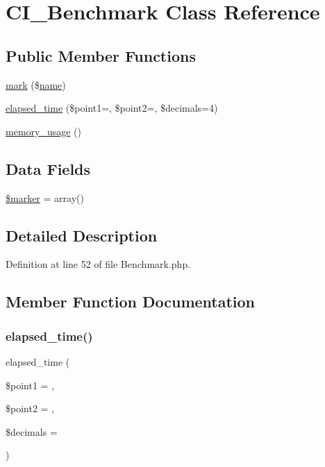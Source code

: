 \hypertarget{class_c_i___benchmark}{}\section{C\+I\+\_\+\+Benchmark Class Reference}
\label{class_c_i___benchmark}
\subsection*{Public Member Functions}
\begin{DoxyCompactItemize}
\item 
\mbox{\hyperlink{class_c_i___benchmark_a18c82f5dd0118d3e7c57bcd86dc32e9e}{mark}} (\$\mbox{\hyperlink{waiter_2order_8php_afb270cde4944e425a37cf277116a7f43}{name}})
\item 
\mbox{\hyperlink{class_c_i___benchmark_acfe5ce040b92f677e01b5dcc9cdcc3bf}{elapsed\+\_\+time}} (\$point1=\textquotesingle{}\textquotesingle{}, \$point2=\textquotesingle{}\textquotesingle{}, \$decimals=4)
\item 
\mbox{\hyperlink{class_c_i___benchmark_abdb10dca75c4c15f94796af1602d5b80}{memory\+\_\+usage}} ()
\end{DoxyCompactItemize}
\subsection*{Data Fields}
\begin{DoxyCompactItemize}
\item 
\mbox{\hyperlink{class_c_i___benchmark_aad34fbf53cda6bd8a3a9c46764d534fa}{\$marker}} = array()
\end{DoxyCompactItemize}


\subsection{Detailed Description}


Definition at line 52 of file Benchmark.\+php.



\subsection{Member Function Documentation}
\mbox{\label{class_c_i___benchmark_acfe5ce040b92f677e01b5dcc9cdcc3bf}} 
\subsubsection{\texorpdfstring{elapsed\_time()}{elapsed\_time()}}
{\footnotesize\ttfamily elapsed\+\_\+time (\begin{DoxyParamCaption}\item[{}]{\$point1 = {\ttfamily \textquotesingle{}\textquotesingle{}},  }\item[{}]{\$point2 = {\ttfamily \textquotesingle{}\textquotesingle{}},  }\item[{}]{\$decimals = {} }\end{DoxyParamCaption})}

